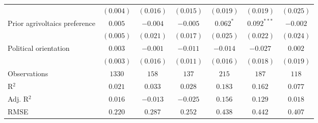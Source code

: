 \begin{center}
\begin{small}
\begin{longtable}{l@{} c@{} c@{} c@{} c@{} c@{} c@{}}
                                    & $(0.004)$     & $(0.016)$ & $(0.015)$ & $(0.019)$      & $(0.019)$       & $(0.025)$   \\
\quad Prior agrivoltaics preference & $0.005$       & $-0.004$  & $-0.005$  & $0.062^{*}$    & $0.092^{***}$   & $-0.002$    \\
                                    & $(0.005)$     & $(0.021)$ & $(0.017)$ & $(0.025)$      & $(0.022)$       & $(0.024)$   \\
\quad Political orientation         & $0.003$       & $-0.001$  & $-0.011$  & $-0.014$       & $-0.027$        & $0.002$     \\
                                    & $(0.003)$     & $(0.016)$ & $(0.011)$ & $(0.016)$      & $(0.018)$       & $(0.019)$   \\
\hline
Observations                        & $1330$        & $158$     & $137$     & $215$          & $187$           & $118$       \\
R$^2$                               & $0.021$       & $0.033$   & $0.028$   & $0.183$        & $0.162$         & $0.077$     \\
Adj. R$^2$                          & $0.016$       & $-0.013$  & $-0.025$  & $0.156$        & $0.129$         & $0.018$     \\
RMSE                                & $0.220$       & $0.287$   & $0.252$   & $0.438$        & $0.442$         & $0.407$     \\
\end{longtable}
\end{small}
\end{center}
